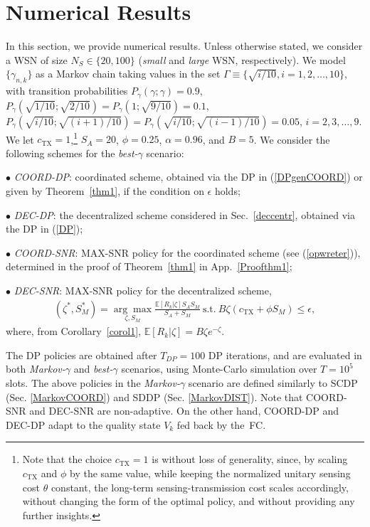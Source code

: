 \documentclass[10pt,twocolumn,twoside]{IEEEtran}
\theoremstyle{plain}
\begin{document}
\section{Numerical Results}\label{numres}
\noindent In this section, we provide numerical results.
Unless otherwise stated, we consider a WSN of size $N_S{\in}\{20,100\}$ (\emph{small} and \emph{large} WSN, respectively).
We model $\{\gamma_{n,k}\}$
as a Markov chain taking values in the set $\Gamma{\equiv}\{\sqrt{i/10},i{=}1,2,\dots,10\}$, with transition probabilities
$P_\gamma(\gamma;\gamma){=}0.9$,
$P_\gamma(\sqrt{1/10};\sqrt{2/10}){=}P_\gamma(1;\sqrt{9/10}){=}0.1$,
$P_\gamma(\sqrt{i/10};\sqrt{(i+1)/10}){=}P_\gamma(\sqrt{i/10};\sqrt{(i-1)/10}){=}0.05$, $i{=}2,3,\dots,9$.
We let $c_{\mathrm{TX}}{=}1$,\footnote{{Note that the choice $c_{\mathrm{TX}}=1$ is without loss of generality, since, by scaling
$c_{\mathrm{TX}}$ and $\phi$ by the same value, while keeping the normalized unitary sensing cost $\theta$ constant,
 the long-term sensing-transmission cost scales accordingly, without changing
the form of the optimal policy, and without providing any further insights.}} $S_A=20$, $\phi=0.25$, $\alpha=0.96$, and $B=5$.
We consider the following schemes for the \emph{best-}$\gamma$ scenario:

\noindent
$\bullet$ \emph{COORD-DP}: coordinated scheme, obtained via the DP in (\ref{DPgenCOORD}) or given by
 Theorem~\ref{thm1}, if the condition on $\epsilon$ holds;
 
 \noindent$\bullet$  \emph{DEC-DP}: the decentralized scheme considered in Sec.~\ref{deccentr},
obtained via the DP in (\ref{DP});

\noindent
$\bullet$ \emph{COORD-SNR}: 
MAX-SNR policy for the coordinated scheme (see (\ref{opwreter})),
determined in the proof of Theorem~\ref{thm1} in App.~\ref{Proofthm1};

\noindent
$\bullet$ \emph{DEC-SNR}: 
MAX-SNR policy for the decentralized scheme,
\begin{align*}
(\zeta^*,S_M^*){=}\underset{\zeta,S_M}{\arg\max}\frac{\mathbb E[\left.R_k\right|\zeta]S_AS_M}{S_A+S_M}\ \text{s.t.}\ B\zeta(c_{\mathrm{TX}}+\phi S_M)\leq\epsilon,
\end{align*}
where, from Corollary~\ref{corol1}, $\mathbb E[\left.R_k\right|\zeta]=B\zeta e^{-\zeta}$.

The DP policies are obtained after $T_{DP}{=}100$ DP iterations, and are evaluated in both \emph{Markov-}$\gamma$
and \emph{best-}$\gamma$ scenarios,
using Monte-Carlo simulation over $T{=}10^5$ slots.
The above policies in the \emph{Markov-}$\gamma$ scenario are defined similarly to
 SCDP (Sec. \ref{MarkovCOORD}) and SDDP (Sec. \ref{MarkovDIST}).
Note that COORD-SNR and DEC-SNR are non-adaptive.
On the other hand,  COORD-DP and DEC-DP adapt to the quality state $V_k$ fed back by the~FC.
\end{document}
